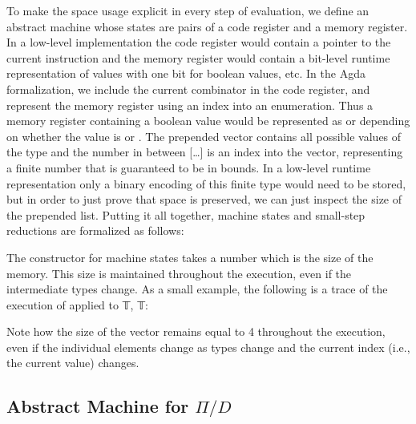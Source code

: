 \documentclass[sigplan,10pt,review,anonymous]{acmart}
\begin{document}
\PIMEMcardeq{}

\vspace{-\baselineskip}

To make the space usage explicit in every step of evaluation, we
define an abstract machine whose states are pairs of a code register
and a memory register. In a low-level implementation the code register
would contain a pointer to the current instruction and the memory
register would contain a bit-level runtime representation of values
with one bit for boolean values, etc. In the Agda formalization, we
include the current combinator in the code register, and represent the
memory register using an index into an enumeration. Thus a memory
register containing a boolean value would be represented as
\AgdaFunction{[𝔽 ,  𝕋 ][0]} or \AgdaFunction{[𝔽 ,  𝕋 ][1]} depending on whether the
value is  or .
The prepended vector contains all possible values of the type and the number in between [\ldots ]
is an index into the vector, representing a finite number that
is guaranteed to be in bounds. In a low-level runtime representation
only a binary encoding of this finite type would need to be stored, but in
order to just prove that space is preserved, we can just inspect the
size of the prepended list. Putting it all together, machine states and
small-step reductions are formalized as follows:

\PIMEMstep{}


The constructor for machine states takes a number which is the size of
the memory. This size is maintained throughout the execution,
even if the intermediate types change. As a small example, the
following is a trace of the execution of  applied
to 𝕋, 𝕋:

{\center}

Note how the size of the vector remains equal to 4 throughout the
execution, even if the individual elements change as types change and
the current index (i.e., the current value) changes.


\subsection{Abstract Machine for $\Pi/D$}
\end{document}
